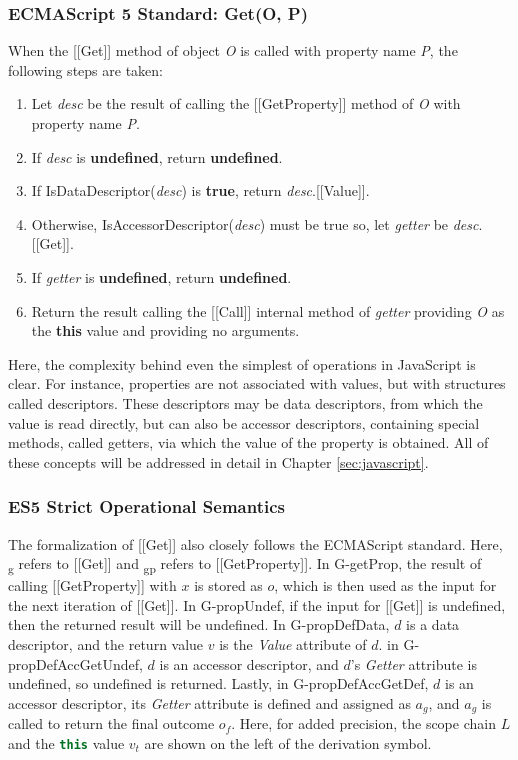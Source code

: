 \documentclass[a4paper,11pt,twoside]{report}
\def\jsinline{\lstinline[language=JavaScript, basicstyle=\small]}%\end{lstlisting}
\begin{document}
\subsubsection{ECMAScript 5 Standard: Get(O, P)}\label{sec:getstandard}
When the [[Get]] method of object \textit{O} is called with property name \textit{P}, the following steps are taken:
\begin{enumerate}
\setlength{\itemsep}{0pt}
\item Let \textit{desc} be the result of calling the [[GetProperty]] method of \textit{O} with property name \textit{P}.
\item If \textit{desc} is \textbf{undefined}, return \textbf{undefined}.
\item If IsDataDescriptor(\textit{desc}) is \textbf{true}, return \textit{desc}.[[Value]].
\item Otherwise, IsAccessorDescriptor(\textit{desc}) must be true so, let \textit{getter} be \textit{desc}.[[Get]].
\item If \textit{getter} is \textbf{undefined}, return \textbf{undefined}.
\item Return the result calling the [[Call]] internal method of \textit{getter} providing \textit{O} as the \textbf{this} value and providing no arguments.
\end{enumerate}

\noindent Here, the complexity behind even the simplest of operations in JavaScript is clear. For instance, properties are not associated with values, but with structures called descriptors. These descriptors may be data descriptors, from which the value is read directly, but can also be accessor descriptors, containing special methods, called getters, via which the value of the property is obtained. All of these concepts will be addressed in detail in Chapter \ref{sec:javascript}.

\subsubsection{ES5 Strict Operational Semantics}
The formalization of [[Get]] also closely follows the ECMAScript standard. Here, \textsubscript{g} refers to [[Get]] and \textsubscript{gp} refers to [[GetProperty]]. In G-getProp, the result of calling [[GetProperty]] with $x$ is stored as $o$, which is then used as the input for the next iteration of [[Get]]. In G-propUndef, if the input for [[Get]] is undefined, then the returned result will be undefined. In G-propDefData, $d$ is a data descriptor, and the return value $v$ is the \textit{Value} attribute of $d$. in G-propDefAccGetUndef, $d$ is an accessor descriptor, and $d$'s \textit{Getter} attribute is undefined, so undefined is returned. Lastly, in G-propDefAccGetDef, $d$ is an accessor descriptor, its \textit{Getter} attribute is defined and assigned as $a_g$, and $a_g$ is called to return the final outcome $o_f$. Here, for added precision, the scope chain $L$ and the \jsinline|this| value $v_t$ are shown on the left of the derivation symbol.
\end{document}
